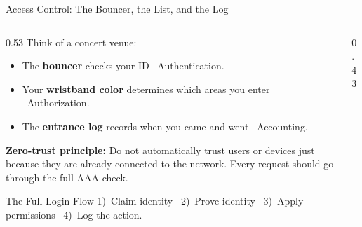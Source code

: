 \documentclass[aspectratio=169]{beamer}  %
\begin{document}
\begin{frame}{Access Control: The Bouncer, the List, and the Log}
    \begin{columns}[T]
        \begin{column}{0.53\textwidth}
            \footnotesize
            Think of a concert venue:
            \begin{itemize}
                \item The \textbf{bouncer} checks your ID \textrightarrow\ Authentication.
                \item Your \textbf{wristband color} determines which areas you enter \textrightarrow\ Authorization.
                \item The \textbf{entrance log} records when you came and went \textrightarrow\ Accounting.
            \end{itemize}
            \vspace{0.4em}
            \textbf{Zero-trust principle:} Do not automatically trust users or devices just because they are already connected to the network. Every request should go through the full AAA check.

            \begin{exampleblock}{The Full Login Flow}
                \footnotesize
                1)~Claim identity \textrightarrow\ 2)~Prove identity \textrightarrow\ 3)~Apply permissions \textrightarrow\ 4)~Log the action.
            \end{exampleblock}
        \end{column}
        \begin{column}{0.43\textwidth}
            \begin{center}
            \end{center}
        \end{column}
    \end{columns}
\end{frame}
\end{document}
